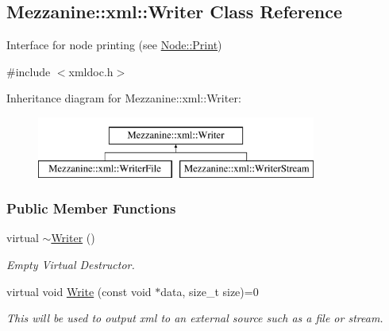 \hypertarget{classMezzanine_1_1xml_1_1Writer}{
\subsection{Mezzanine::xml::Writer Class Reference}
\label{classMezzanine_1_1xml_1_1Writer}
}


Interface for node printing (see \hyperlink{classMezzanine_1_1xml_1_1Node_a94b9b66aff6d1d6a26c1dd5949fabb25}{Node::Print})  




{\ttfamily \#include $<$xmldoc.h$>$}

Inheritance diagram for Mezzanine::xml::Writer:\begin{figure}[H]
\begin{center}
\leavevmode
\includegraphics[height=2.000000cm]{classMezzanine_1_1xml_1_1Writer}
\end{center}
\end{figure}
\subsubsection*{Public Member Functions}
\begin{DoxyCompactItemize}
\item 
\hypertarget{classMezzanine_1_1xml_1_1Writer_a86cf5ad81b140ddf757ef46afed0367c}{
virtual \hyperlink{classMezzanine_1_1xml_1_1Writer_a86cf5ad81b140ddf757ef46afed0367c}{$\sim$Writer} ()}
\label{classMezzanine_1_1xml_1_1Writer_a86cf5ad81b140ddf757ef46afed0367c}

\begin{DoxyCompactList}\small\item\em Empty Virtual Destructor. \item\end{DoxyCompactList}\item 
virtual void \hyperlink{classMezzanine_1_1xml_1_1Writer_abdb52bc1b26e6bb39682e0d29ceeab64}{Write} (const void $\ast$data, size\_\-t size)=0
\begin{DoxyCompactList}\small\item\em This will be used to output xml to an external source such as a file or stream. \item\end{DoxyCompactList}\end{DoxyCompactItemize}


